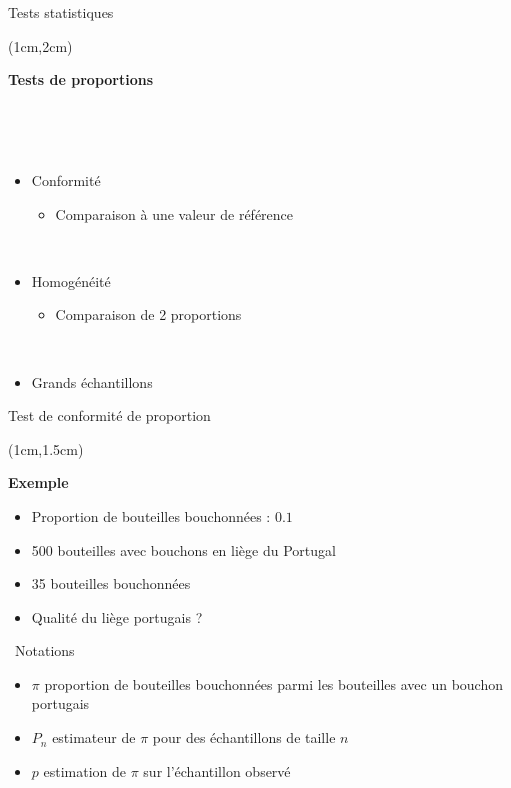 \documentclass{beamer}
\begin{document}

\begin{frame}{Tests statistiques}
\begin{textblock*}{\textwidth}(1cm,2cm)


\begin{center}{\bf \Large Tests de proportions} \end{center}


\

\

\begin{itemize}
\item Conformité
\begin{itemize}
\item Comparaison à une valeur de référence
\end{itemize}

\
\item Homogénéité
\begin{itemize}
\item Comparaison de 2 proportions
\end{itemize}

\
\item Grands échantillons
\end{itemize}


\end{textblock*}

\end{frame}


\begin{frame}{Test de conformité de proportion}
\begin{textblock*}{\textwidth}(1cm,1.5cm)

\begin{center}{\bf \Large Exemple  } \end{center}


\begin{itemize}
\item  Proportion de bouteilles bouchonnées : $0.1$
\item  500 bouteilles avec bouchons en liège du Portugal
\item  35 bouteilles bouchonnées
\item Qualité du liège portugais ?
\end{itemize}

\
Notations 
\begin{itemize}
\item $\pi$ proportion de bouteilles bouchonnées parmi les bouteilles 
avec un bouchon portugais
\item $P_n$ estimateur de $\pi$ pour des échantillons de taille $n$
\item $p$ estimation de $\pi$ sur l'échantillon observé
\end{itemize}

\end{textblock*}

\end{frame}
  
\end{document}
